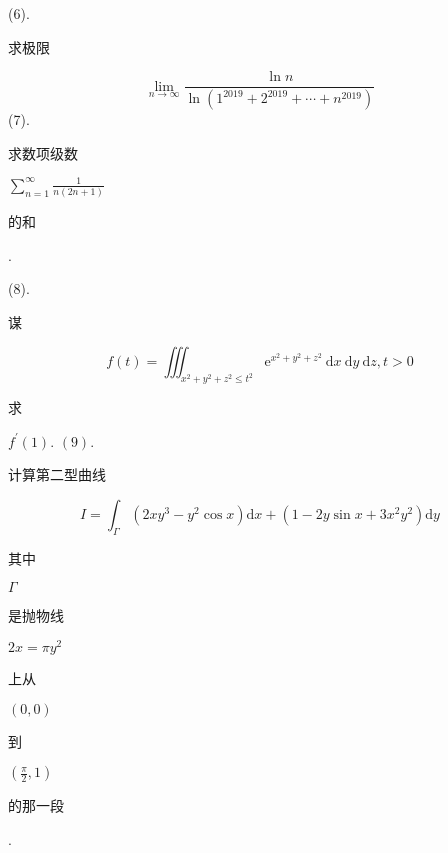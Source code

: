 \documentclass[10pt]{article}
\begin{document}
(6). \begin{CJK}{UTF8}{mj}求极限\end{CJK}
$$
\lim _{n \rightarrow \infty} \frac{\ln n}{\ln \left(1^{2019}+2^{2019}+\cdots+n^{2019}\right)}
$$
(7). \begin{CJK}{UTF8}{mj}求数项级数\end{CJK} $\sum_{n=1}^{\infty} \frac{1}{n(2 n+1)}$ \begin{CJK}{UTF8}{mj}的和\end{CJK}.

(8). \begin{CJK}{UTF8}{mj}谋\end{CJK}
$$
f(t)=\iiint_{x^{2}+y^{2}+z^{2} \leq t^{2}} \mathrm{e}^{x^{2}+y^{2}+z^{2}} \mathrm{~d} x \mathrm{~d} y \mathrm{~d} z, t>0
$$
\begin{CJK}{UTF8}{mj}求\end{CJK} $f^{\prime}(1)$. $(9)$. \begin{CJK}{UTF8}{mj}计算第二型曲线\end{CJK}
$$
I=\int_{\Gamma}\left(2 x y^{3}-y^{2} \cos x\right) \mathrm{d} x+\left(1-2 y \sin x+3 x^{2} y^{2}\right) \mathrm{d} y
$$
\begin{CJK}{UTF8}{mj}其中\end{CJK} $\Gamma$ \begin{CJK}{UTF8}{mj}是抛物线\end{CJK} $2 x=\pi y^{2}$ \begin{CJK}{UTF8}{mj}上从\end{CJK} $(0,0)$ \begin{CJK}{UTF8}{mj}到\end{CJK} $\left(\frac{\pi}{2}, 1\right)$ \begin{CJK}{UTF8}{mj}的那一段\end{CJK}.
\end{document}

